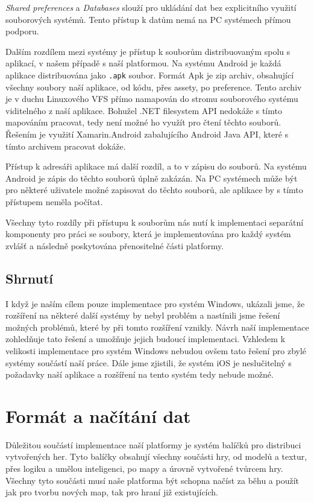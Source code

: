 \textit{Shared preferences} a \textit{Databases} slouží pro ukládání dat bez explicitního využití souborových systémů. Tento přístup k datům nemá na PC systémech přímou podporu.


Dalším rozdílem mezi systémy je přístup k souborům distribuovaným spolu s aplikací, v našem případě s naší platformou. Na systému Android je každá aplikace distribuována jako \texttt{.apk} soubor. Formát Apk je zip archiv, obsahující všechny soubory naší aplikace, od kódu, přes assety, po preference. Tento archiv je v duchu Linuxového VFS přímo namapován do stromu souborového systému viditelného z naší aplikace. Bohužel .NET filesystem API nedokáže s tímto mapováním pracovat, tedy není možné ho využít pro čtení těchto souborů. Řešením je využití Xamarin.Android zabalujícího Android Java API, které s tímto archivem pracovat dokáže.

Přístup k adresáři aplikace má další rozdíl, a to v zápisu do souborů. Na systému Android je zápis do těchto souborů úplně zakázán. Na PC systémech může být pro některé uživatele možné zapisovat do těchto souborů, ale aplikace by s tímto přístupem neměla počítat.

Všechny tyto rozdíly při přístupu k souborům nás nutí k implementaci separátní komponenty pro práci se soubory, která je implementována pro každý systém zvlášť a následně poskytována přenositelné části platformy.

\subsection{Shrnutí}
I když je naším cílem pouze implementace pro systém Windows, ukázali jsme, že rozšíření na některé další systémy by nebyl problém a nastínili jsme řešení možných problémů, které by při tomto rozšíření vznikly. Návrh naší implementace zohledňuje tato řešení a umožňuje jejich  budoucí implementaci. Vzhledem k velikosti implementace pro systém Windows nebudou ovšem tato řešení pro zbylé systémy součástí naší práce. Dále jsme zjistili, že systém iOS je neslučitelný s požadavky naší aplikace a rozšíření na tento systém tedy nebude možné.

\section{Formát a načítání dat}
Důležitou součástí implementace naší platformy je systém balíčků pro distribuci vytvořených her. Tyto balíčky obsahují všechny součásti hry, od modelů a textur, přes logiku a umělou inteligenci, po mapy a úrovně vytvořené tvůrcem hry. Všechny tyto součásti musí naše platforma být schopna načíst za běhu a použít jak pro tvorbu nových map, tak pro hraní již existujících.

